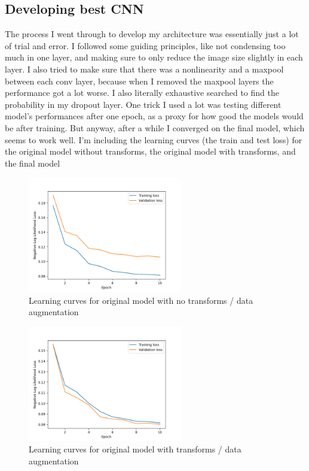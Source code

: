 \subsection{Developing best CNN}
The process I went through to develop my architecture was essentially just a lot
of trial and error. I followed some guiding principles, like not condensing too
much in one layer, and making sure to only reduce the image size slightly in
each layer. I also tried to make sure that there was a nonlinearity and a
maxpool between each conv layer, because when I removed the maxpool layers the
performance got a lot worse. I also literally exhaustive searched to find the
probability in my dropout layer.
One trick I used a lot was testing different model's performances after one
epoch, as a proxy for how good the models would be after training. But anyway,
after a while I converged on the final model, which seems to work well.
I'm including the learning curves (the train and test loss) for the original
model without transforms, the original model with transforms, and the final
model

\begin{figure}[H]
\caption{Learning curves for original model with no transforms / data augmentation}
\centering
\includegraphics[width=0.6\textwidth]{plots/no_transform_curves.png}
\end{figure}

\begin{figure}[H]
\caption{Learning curves for original model with transforms / data augmentation}
\centering
\includegraphics[width=0.6\textwidth]{plots/transform_V0_curves.png}
\end{figure}

